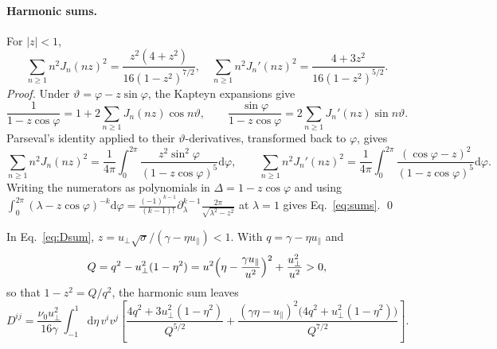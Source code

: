 \documentclass[11pt,a4paper]{article}
\numberwithin{equation}{section}
\newcommand{\dd}{\mathrm{d}}
\newcommand{\upar}{u_\parallel}
\newcommand{\uperp}{u_\perp}
\begin{document}
\paragraph{Harmonic sums.} For $|z|<1$,
\begin{equation}
\sum_{n\ge1}n^2J_n(nz)^2=\frac{z^2(4+z^2)}{16(1-z^2)^{7/2}},\quad
\sum_{n\ge1}n^2J_n'(nz)^2=\frac{4+3z^2}{16(1-z^2)^{5/2}} .
\label{eq:sums}
\end{equation}
\emph{Proof.} Under $\vartheta=\varphi-z\sin\varphi$, the Kapteyn expansions give
\[
\frac{1}{1-z\cos\varphi}=1+2\sum_{n\ge1}J_n(nz)\cos n\vartheta,\qquad
\frac{\sin\varphi}{1-z\cos\varphi}=2\sum_{n\ge1}J_n'(nz)\sin n\vartheta .
\]
Parseval's
identity applied to their $\vartheta$-derivatives, transformed back to
$\varphi$, gives
\begin{equation}
\sum_{n\ge1}n^2J_n(nz)^2=\frac1{4\pi}\int_0^{2\pi}\frac{z^2\sin^2\varphi}{(1-z\cos\varphi)^5}\dd\varphi,\qquad
\sum_{n\ge1}n^2J_n'(nz)^2=\frac1{4\pi}\int_0^{2\pi}\frac{(\cos\varphi-z)^2}{(1-z\cos\varphi)^5}\dd\varphi .
\end{equation}
Writing the numerators as polynomials in $\Delta=1-z\cos\varphi$ and using
$\int_0^{2\pi}(\lambda-z\cos\varphi)^{-k}\dd\varphi=\frac{(-1)^{k-1}}{(k-1)!}\partial_\lambda^{k-1}\frac{2\pi}{\sqrt{\lambda^2-z^2}}$
at $\lambda=1$ gives Eq.~\eqref{eq:sums}. \qed

In Eq.~\eqref{eq:Dsum}, $z=\uperp\sqrt\sigma/(\gamma-\eta\upar)<1$. With
$q=\gamma-\eta\upar$ and
\begin{equation}
Q=q^2-\uperp^2(1-\eta^2)=u^2\Bigl(\eta-\frac{\gamma\upar}{u^2}\Bigr)^2+\frac{\uperp^2}{u^2}>0,
\end{equation}
so that $1-z^2=Q/q^2$, the harmonic sum leaves
\begin{equation}
D^{ij}=\frac{\nu_0\uperp^2}{16\gamma}\int_{-1}^{1}\dd\eta\,v^iv^j
\left[\frac{4q^2+3\uperp^2(1-\eta^2)}{Q^{5/2}}+\frac{(\gamma\eta-\upar)^2\bigl(4q^2+\uperp^2(1-\eta^2)\bigr)}{Q^{7/2}}\right].
\label{eq:Deta}
\end{equation}
\end{document}
